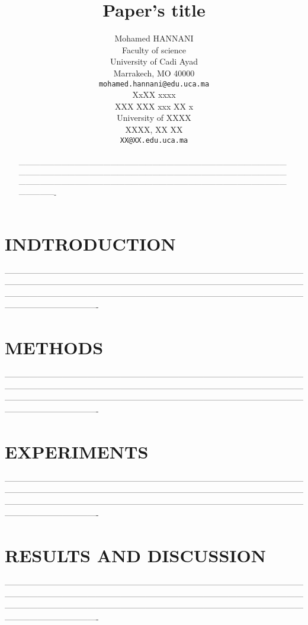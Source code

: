\documentclass{article}
\title{Paper's title}
\author{
  Mohamed HANNANI \\
  Faculty of science\\
  University of Cadi Ayad\\
  Marrakech, MO 40000 \\
  \texttt{mohamed.hannani@edu.uca.ma} \\
   \And
 XxXX xxxx \\
  XXX XXX xxx XX x\\
  University of XXXX\\
  XXXX, XX XX \\
  \texttt{XX@XX.edu.uca.ma} \\
}
\begin{document}
\maketitle
\begin{abstract}
----------------------------------------------------------------------------------------------------------------------------------------------------------------------------------------------------------------------------------------------------------------------------------------------------------------------------------------------------------------------
\end{abstract}




\section{INDTRODUCTION}
----------------------------------------------------------------------------------------------------------------------------------------------------------------------------------------------------------------------------------------------------------------------------------------------------------------------------------------------------------------------



\section{METHODS}
----------------------------------------------------------------------------------------------------------------------------------------------------------------------------------------------------------------------------------------------------------------------------------------------------------------------------------------------------------------------
\section{EXPERIMENTS}
----------------------------------------------------------------------------------------------------------------------------------------------------------------------------------------------------------------------------------------------------------------------------------------------------------------------------------------------------------------------
\section{RESULTS AND DISCUSSION}
----------------------------------------------------------------------------------------------------------------------------------------------------------------------------------------------------------------------------------------------------------------------------------------------------------------------------------------------------------------------
\end{document}
